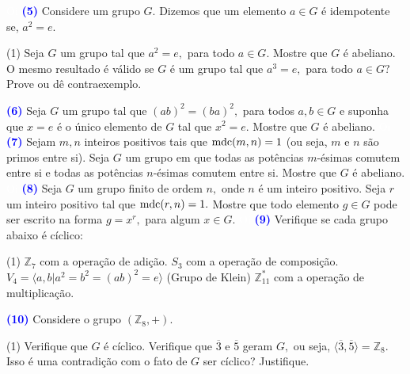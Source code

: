 \documentclass[12pt, a4paper]{article}
\newcommand{\mdc}{{\rm mdc}}
\newcommand{\negrito}[1]{\mbox{\boldmath{$#1$}}}
\begin{document}
\textcolor{white}{Oi}\newline\newline
\textcolor{blue}{\bf(5)}\label{5} Considere um grupo $G$. Dizemos que um elemento $a \in G$ é idempotente se, $a^2 = e.$
\begin{tasks}[counter-format={(tsk[a])},label-width=3.6ex, label-format = {\bfseries}, column-sep = {0pt}](1)
\task[\textcolor{Floresta}{$\negrito{(a)} $}] Seja $G$ um grupo tal que $a^2 = e,$ para todo $a \in G.$ Mostre que $G$ é abeliano.
\task[\textcolor{Floresta}{$\negrito{(b)} $}] O mesmo resultado é válido se $G$ é um grupo tal que $a^3 = e,$ para todo $a \in G?$ Prove ou dê contraexemplo.
\end{tasks}
\textcolor{blue}{\bf(6)}\label{6} Seja $G$ um grupo tal que $(ab)^2 = (ba)^2,$ para todos $a,b \in G$ e suponha que $x = e$ é o único elemento de $G$ tal que $x^2 = e.$ Mostre que $G$ é abeliano. 
\textcolor{white}{Oi}\newline\newline
\textcolor{blue}{\bf(7)}\label{7} Sejam $m,n$ inteiros positivos tais que $\mdc(m,n) = 1$ (ou seja, $m$ e $n$ são primos entre si). Seja $G$ um grupo em que todas as potências $m$-ésimas comutem entre si e todas as potências $n$-ésimas comutem entre si. Mostre que $G$ é abeliano.
\textcolor{white}{Oi}\newline\newline
\textcolor{blue}{\bf(8)}\label{8} Seja $G$ um grupo finito de ordem $n,$ onde $n$ é um inteiro positivo. Seja $r$ um inteiro positivo tal que $\mdc(r,n)=1.$ Mostre que todo elemento $g \in G$ pode ser escrito na forma $g = x^r,$ para algum $x \in G.$%
\textcolor{white}{Oi}\newline\newline
\textcolor{blue}{\bf(9)}\label{ex1} Verifique se cada grupo abaixo é cíclico:%
\begin{tasks}[counter-format={(tsk[a])},label-width=3.6ex, label-format = {\bfseries}, column-sep = {0pt}](1)
\task[\textcolor{Floresta}{$\negrito{(a)} $}] $\mathbb{Z}_7$ com a operação de adição.
\task[\textcolor{Floresta}{$\negrito{(b)} $}] $S_3$ com a operação de composição.
\task[\textcolor{Floresta}{$\negrito{(c)} $}] $V_4 = \langle a,b | a^2 = b^2 = (ab)^2 = e \rangle$ (Grupo de Klein)
\task[\textcolor{Floresta}{$\negrito{(d)} $}] $\mathbb{Z}^{*}_{11}$ com a operação de multiplicação.
\end{tasks}
\textcolor{blue}{\bf(10)}\label{ex2} Considere o grupo $(\mathbb{Z}_8, +).$
\begin{tasks}[counter-format={(tsk[a])},label-width=3.6ex, label-format = {\bfseries}, column-sep = {0pt}](1)
\task[\textcolor{Floresta}{$\negrito{(a)} $}] Verifique que $G$ é cíclico.
\task[\textcolor{Floresta}{$\negrito{(b)} $}] Verifique que $\overline{3}$ e $\overline{5}$ geram $G,$ ou seja, $\langle \overline{3}, \overline{5} \rangle = \mathbb{Z}_8.$ Isso é uma contradição com o fato de $G$ ser cíclico? Justifique.
\end{tasks}
\newpage
\end{document}
